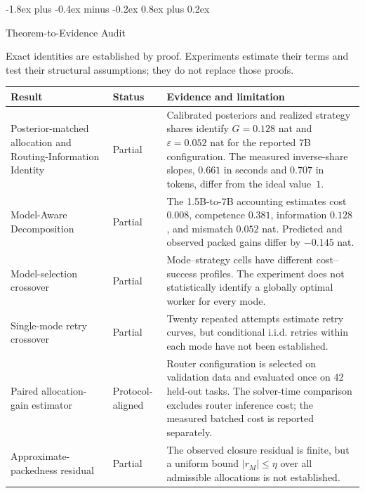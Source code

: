 \documentclass[10pt,twocolumn]{article}
\makeatletter
\theoremstyle{paperplain}
\theoremstyle{paperdefinition}
\theoremstyle{paperremark}
\renewcommand{\section}{%
  \@startsection{section}{1}{\z@}%
    {-1.8ex plus -0.4ex minus -0.2ex}%
    {0.8ex plus 0.2ex}%
    {\normalfont\large\bfseries\raggedright}}
\makeatother
\begin{document}
\section{Theorem-to-Evidence Audit}
\label{app:theorem-evidence}

Exact identities are established by proof.  Experiments estimate their terms
and test their structural assumptions; they do not replace those proofs.

\begin{center}
\small
\renewcommand{\arraystretch}{1.2}
\begin{tabular}{@{}p{4.2cm}p{3.1cm}p{8.2cm}@{}}
\toprule
\textbf{Result} & \textbf{Status} & \textbf{Evidence and limitation} \\
\midrule
Posterior-matched allocation and Routing-Information Identity
& Partial
& Calibrated posteriors and realized strategy shares identify $G=0.128$ nat
and $\varepsilon=0.052$ nat for the reported 7B configuration.  The measured
inverse-share slopes, $0.661$ in seconds and $0.707$ in tokens, differ from the
ideal value~$1$. \\

Model-Aware Decomposition
& Partial
& The 1.5B-to-7B accounting estimates cost $0.008$, competence $0.381$,
information $0.128$, and mismatch $0.052$ nat.  Predicted and observed packed
gains differ by $-0.145$ nat. \\

Model-selection crossover
& Partial
& Mode--strategy cells have different cost--success profiles.  The experiment
does not statistically identify a globally optimal worker for every mode. \\

Single-mode retry crossover
& Partial
& Twenty repeated attempts estimate retry curves, but conditional i.i.d.
retries within each mode have not been established. \\

Paired allocation-gain estimator
& Protocol-aligned
& Router configuration is selected on validation data and evaluated once on 42
held-out tasks.  The solver-time comparison excludes router inference cost;
the measured batched cost is reported separately. \\

Approximate-packedness residual
& Partial
& The observed closure residual is finite, but a uniform bound
$|r_M|\le\eta$ over all admissible allocations is not established. \\
\bottomrule
\end{tabular}
\end{center}
\end{document}
